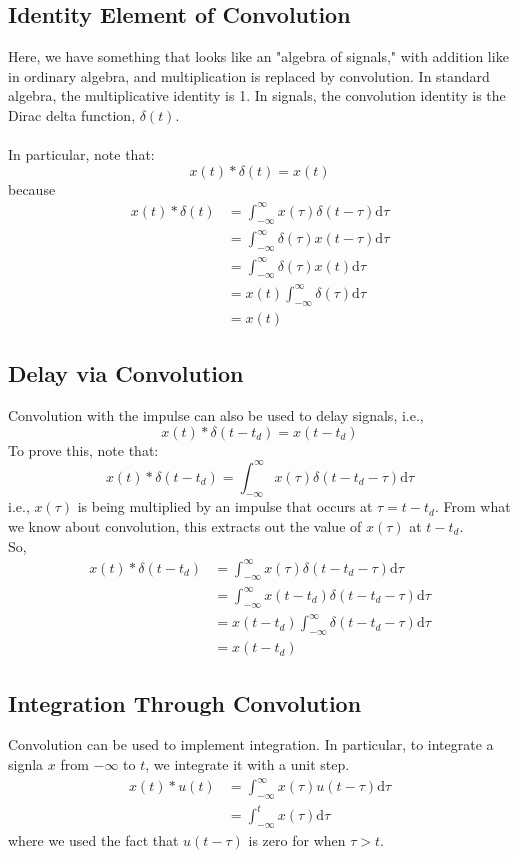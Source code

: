 \documentclass[10pt]{article}
\begin{document}
\subsection*{Identity Element of Convolution}
Here, we have something that looks like an "algebra of signals," with addition like in ordinary algebra, and multiplication is replaced by convolution.  In standard algebra, the multiplicative identity is 1.  In signals, the convolution identity is the Dirac delta function, $\delta(t)$.\\\\
In particular, note that:
\[\boxed{x(t) * \delta(t) = x(t)}\]
because
\begin{align*}
    x(t) * \delta(t) &= \int_{-\infty}^\infty x(\tau) \delta(t - \tau) \text{d} \tau\\
    &= \int_{-\infty}^\infty \delta(\tau) x(t - \tau) \text{d}\tau\\
    &= \int_{-\infty}^\infty \delta(\tau)x(t) \text{d}\tau\\
    &= x(t)\int_{-\infty}^\infty \delta(\tau) \text{d}\tau\\
    &= x(t)
\end{align*}
\subsection*{Delay via Convolution}
Convolution with the impulse can also be used to delay signals, i.e.,
\[\boxed{x(t) * \delta(t - t_d) = x(t - t_d)}\]
To prove this, note that:
\[x(t) * \delta(t - t_d) = \int_{-\infty}^\infty x(\tau) \delta(t - t_d - \tau)\text{d}\tau\]
i.e., $x(\tau)$ is being multiplied by an impulse that occurs at $\tau = t - t_d$.  From what we know about convolution, this extracts out the value of $x(\tau)$ at $t - t_d$.\\
So,
\begin{align*}
    x(t) * \delta(t - t_d) &= \int_{-\infty}^\infty x(\tau) \delta(t - t_d - \tau) \text{d}\tau\\
    &= \int_{-\infty}^\infty x(t - t_d) \delta(t - t_d - \tau) \text{d}\tau\\
    &= x(t - t_d) \int_{-\infty}^\infty \delta(t - t_d - \tau) \text{d}\tau\\
    &= x(t - t_d)
\end{align*}

\subsection*{Integration Through Convolution}
Convolution can be used to implement integration.   In particular, to integrate a signla $x$ from $-\infty$ to $t$, we integrate it with a unit step.
\begin{align*}
    x(t) * u(t) &= \int_{-\infty}^\infty x(\tau) u(t - \tau) \text{d}\tau\\
    &= \int_{-\infty}^t x(\tau) \text{d}\tau
\end{align*}
where we used the fact that $u(t - \tau)$ is zero for when $\tau > t$.
\end{document}
